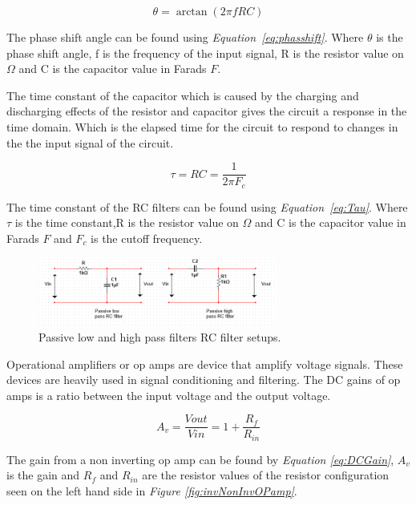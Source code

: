\begin{equation}
    \theta = \arctan(2 \pi fRC)
    \label{eq:phasshift}
\end{equation}

The phase shift angle can be found using \textit{Equation~\ref{eq:phasshift}}.
Where $\theta$ is the phase shift angle, f is the frequency of the input signal, R is the resistor value on $\Omega$ and C is the capacitor value in Farads $F$.

The time constant of the capacitor which is caused by the charging and discharging effects of the resistor and capacitor gives the circuit a response in the time domain. 
Which is the elapsed time for the circuit to respond to changes in the the input signal of the circuit.


\begin{equation}
    \tau = RC = \frac{1}{2\pi F_c}
    \label{eq:Tau}
\end{equation}

The time constant of the RC filters can be found using \textit{Equation~\ref{eq:Tau}}. 
Where $\tau$ is the time constant,R is the resistor value on $\Omega$ and C is the capacitor value in Farads $F$ and $F_c$ is the cutoff frequency. 

\begin{figure}[h]
    \centering
    \includegraphics[width=0.70\textwidth]{graphics/passivehighlow.png}
    \caption{Passive low and high pass filters RC filter setups.}
    \label{fig:PassiveHighLow}
\end{figure}

Operational amplifiers or op amps are device that amplify voltage signals.
These devices are heavily used in signal conditioning and filtering.
The DC gains of op amps is a ratio between the input voltage and the output voltage. 

\begin{equation}
    A_v = \frac{V{out}}{V{in}} = 1 + \frac{R_f}{R_{in}}
    \label{eq:DCGain}
\end{equation}

The gain from a non inverting op amp can be found by \textit{Equation \ref{eq:DCGain}}, $A_v$ is the gain and $R_f$ and $R_{in}$ are the resistor values of the resistor configuration seen on the left hand side in \textit{Figure \ref{fig:invNonInvOPamp}}.


